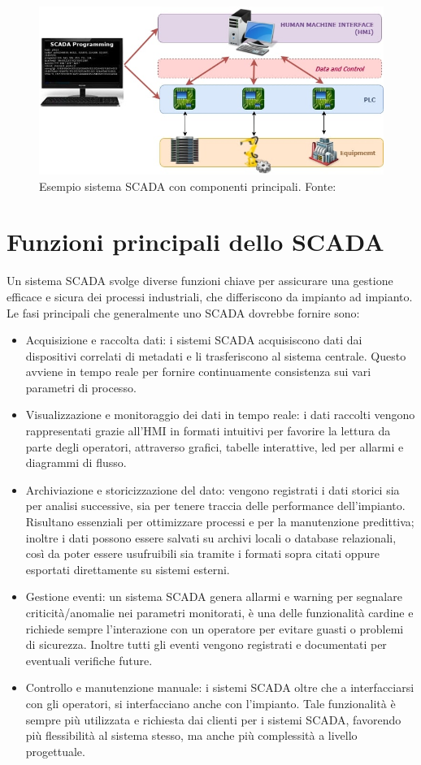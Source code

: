 \begin{figure}
    \centering
    \includegraphics[width=0.7\linewidth]{Immagini/SCADA_system.jpg}
    \caption{Esempio sistema SCADA con componenti principali. Fonte: \cite{exonsys_scada}}
    \label{fig:SCADA_system.jpg}
\end{figure}

\section{Funzioni principali dello SCADA}
Un sistema SCADA svolge diverse funzioni chiave per assicurare una gestione efficace e sicura dei processi industriali, che differiscono da impianto ad impianto. Le fasi principali che generalmente uno SCADA dovrebbe fornire sono:
\begin{itemize}
    \item Acquisizione e raccolta dati: i sistemi SCADA acquisiscono dati dai dispositivi correlati di metadati e li trasferiscono al sistema centrale. Questo avviene in tempo reale per fornire continuamente consistenza sui vari parametri di processo.
    \item Visualizzazione e monitoraggio dei dati in tempo reale: i dati raccolti vengono rappresentati grazie all'HMI in formati intuitivi per favorire la lettura da parte degli operatori, attraverso grafici, tabelle interattive, led per allarmi e diagrammi di flusso.
    \item Archiviazione e storicizzazione del dato: vengono registrati i dati storici sia per analisi successive, sia per tenere traccia delle performance dell'impianto. Risultano essenziali per ottimizzare processi e per la manutenzione predittiva; inoltre i dati possono essere salvati su archivi locali o database relazionali, così da poter essere usufruibili sia tramite i formati sopra citati oppure esportati direttamente su sistemi esterni.
    \item Gestione eventi: un sistema SCADA genera allarmi e warning per segnalare criticità/anomalie nei parametri monitorati, è una delle funzionalità cardine e richiede sempre l'interazione con un operatore per evitare guasti o problemi di sicurezza. Inoltre tutti gli eventi vengono registrati e documentati per eventuali verifiche future.
    \item Controllo e manutenzione manuale: i sistemi SCADA oltre che a interfacciarsi con gli operatori, si interfacciano anche con l'impianto. Tale funzionalità è sempre più utilizzata e richiesta dai clienti per i sistemi SCADA, favorendo più flessibilità al sistema stesso, ma anche più complessità a livello progettuale.
\end{itemize}
